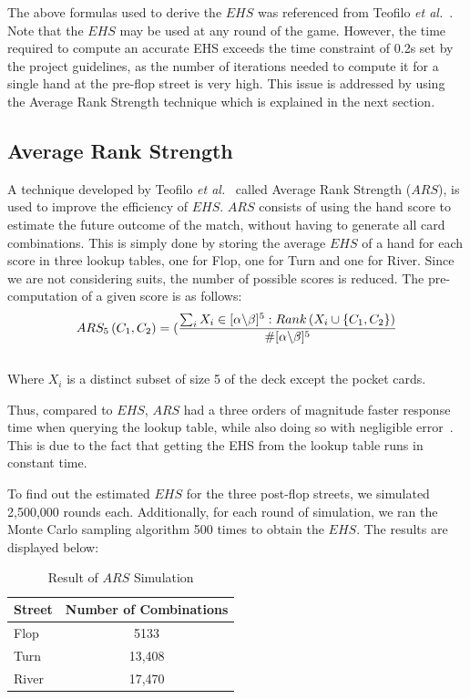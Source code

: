 \documentclass{article}
\begin{document}
\noindent The above formulas used to derive the $EHS$ was referenced from Teofilo \textit{et al.}~. Note that the $EHS$ may be used at any round of the game. However, the time required to compute an accurate EHS exceeds the time constraint of 0.2s set by the project guidelines, as the number of iterations needed to compute it for a single hand at the pre-flop street is very high. This issue is addressed by using the Average Rank Strength technique which is explained in the next section.

\subsection{Average Rank Strength}

A technique developed by Teofilo \textit{et al.}~ called Average Rank Strength ($ARS$), is used to improve the efficiency of $EHS$. $ARS$ consists of using the hand score to estimate the future outcome of the match, without having to generate all card combinations. This is simply done by storing the average $EHS$ of a hand for each score in three lookup tables, one for Flop, one for Turn and one for River. Since we are not considering suits, the number of possible scores is reduced. The pre-computation of a given score is as follows:
\begin{displaymath}
  ARS_{5}\left(C_{1}, C_{2}\right)=(\frac{\sum_{i}X_{i} \in [\alpha \char`\\ \beta]^{5}:Rank \left(X_{i} \cup \left \lbrace C_{1}, C_{2} \right \rbrace \right)}{\#[\alpha \char`\\ \beta]^{5}}
\end{displaymath}\\
Where $X_i$ is a distinct subset of size 5 of the deck except the pocket cards.

Thus, compared to $EHS$, $ARS$ had a three orders of magnitude faster response time when querying the lookup table, while also doing so with negligible error~\cite{trc:ars}. This is due to the fact that getting the EHS from the lookup table runs in constant time.

To find out the estimated $EHS$ for the three post-flop streets, we simulated 2,500,000 rounds each. Additionally, for each round of simulation, we ran the Monte Carlo sampling algorithm 500 times to obtain the $EHS$. The results are displayed below:

\begin{table}[h!]
  \begin{center}
    \begin{tabular}{l|c}
      \textbf{Street} & \textbf{Number of Combinations} \\
      \hline
      Flop & 5133 \\
      Turn & 13,408 \\
      River & 17,470 \\
    \end{tabular}
    \caption{Result of $ARS$ Simulation}
    \label{tab:table2}
  \end{center}
\end{table}
\end{document}
